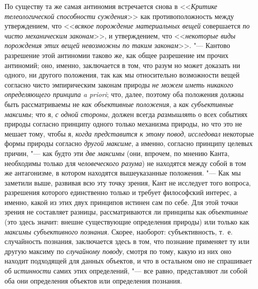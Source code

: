 {{По существу та же самая антиномия встречается снова в
<<{\em Критике телеологической
способности суждения}>> как противоположность между
утверждением, что <<{\em всякое
порождение материальных вещей} совершается
{\em по чисто механическим законам}>>,
и утверждением, что
<<{\em некоторые виды порождения этих
вещей невозможны по таким
законам}>>.
"--- Кантово разрешение этой антиномии таково же, как общее
разрешение им прочих антиномий; оно, именно, заключается в том, что разум
но может доказать ни одного, ни другого положения, так как мы относительно
возможности вещей согласно чисто эмпирическим законам природы
{\em не можем иметь никакого
определяющего принципа a priori}; что, далее, поэтому оба
положения должны быть рассматриваемы не
{\em как объективные положения},
а {\em как субъективные
максимы}; что я, {\em с
одной стороны}, должен всегда
{\em размышлять} о всех
событиях природы согласно принципу одного только механизма природы, но что
это не мешает тому, чтобы я, {\em когда
представится к этому повод},
{\em исследовал} некоторые
формы природы согласно {\em другой
максиме}, а именно, согласно принципу целевых причин, "---
как будто эти {\em две
максимы} (они, впрочем, по мнению Канта, необходимы только
для {\em человеческого разума})
не находятся между собой в том же антагонизме, в котором
находятся вышеуказанные положения. "--- Как мы заметили выше,
развивая всю эту точку зрения, Кант не исследует того вопроса, разрешения
которого единственно только и требует философский интерес, а именно, какой
из этих двух принципов истинен сам по себе. Для этой точки зрения не
составляет разницы, рассматриваются ли принципы как
{\em объективные} (это
здесь значит: внешне существующие определения природы) или только как
{\em максимы субъективного познания}.
Скорее, наоборот: субъективность, т.~е. случайность познания,
заключается здесь в том, что познание применяет ту или другую максиму по
{\em случайному поводу},
смотря по тому, какую из них оно находит подходящей для
данных объектов, и что в остальном оно не спрашивает об
{\em истинности} самих
этих определений, "--- все равно, представляют ли собой оба они
определения объектов или определения познания.

}}
